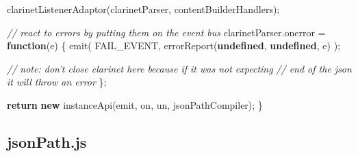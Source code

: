 \documentclass[12pt, ]{article}
\newenvironment{Shaded}{}{}
\newcommand{\KeywordTok}[1]{\textcolor[rgb]{0.00,0.44,0.13}{\textbf{{#1}}}}
\newcommand{\CommentTok}[1]{\textcolor[rgb]{0.38,0.63,0.69}{\textit{{#1}}}}
\newcommand{\OtherTok}[1]{\textcolor[rgb]{0.00,0.44,0.13}{{#1}}}
\newcommand{\FunctionTok}[1]{\textcolor[rgb]{0.02,0.16,0.49}{{#1}}}
\newcommand{\NormalTok}[1]{{#1}}
\begin{document}
\begin{Shaded}
\begin{Highlighting}[]
   \FunctionTok{clarinetListenerAdaptor}\NormalTok{(clarinetParser, contentBuilderHandlers);}
  
   \CommentTok{// react to errors by putting them on the event bus}
   \OtherTok{clarinetParser}\NormalTok{.}\FunctionTok{onerror} \NormalTok{= }\KeywordTok{function}\NormalTok{(e) \{          }
      \FunctionTok{emit}\NormalTok{(}
         \NormalTok{FAIL_EVENT, }
         \FunctionTok{errorReport}\NormalTok{(}\KeywordTok{undefined}\NormalTok{, }\KeywordTok{undefined}\NormalTok{, e)}
      \NormalTok{);}
      
      \CommentTok{// note: don't close clarinet here because if it was not expecting}
      \CommentTok{// end of the json it will throw an error}
   \NormalTok{\};}
   
   \KeywordTok{return} \KeywordTok{new} \FunctionTok{instanceApi}\NormalTok{(emit, on, un, jsonPathCompiler);}
\NormalTok{\}}
\end{Highlighting}
\end{Shaded}

\pagebreak

\subsection{jsonPath.js}\label{headerux5fjsonPath}

\label{src_jsonPath}
\end{document}
